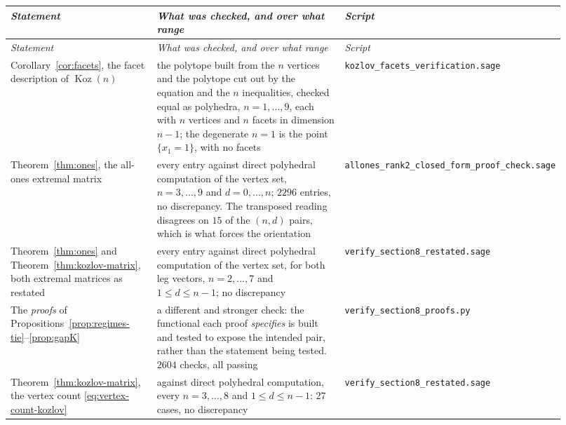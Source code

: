 \documentclass[11pt, a4paper, abstract=yes]{scrartcl}
\theoremstyle{definition}
\theoremstyle{remark}
\theoremstyle{plain}
\newcommand{\Koz}{\operatorname{Koz}}
\begin{document}
\begingroup\small
\begin{longtable}{@{}p{0.27\linewidth}p{0.38\linewidth}>{\raggedright\arraybackslash}p{0.27\linewidth}@{}}
  \toprule
  \emph{Statement} & \emph{What was checked, and over what range} & \emph{Script} \\
  \midrule\endfirsthead
  \toprule
  \emph{Statement} & \emph{What was checked, and over what range} & \emph{Script} \\
  \midrule\endhead
  Corollary~\ref{cor:facets}, the facet description of $\Koz(n)$
    & the polytope built from the $n$ vertices and the polytope cut out by the equation and the
      $n$ inequalities, checked equal as polyhedra, $n = 1,\dots,9$, each with $n$ vertices and
      $n$ facets in dimension $n-1$; the degenerate $n = 1$ is the point $\lbrace x_1=1\rbrace$,
      with no facets
    & \texttt{\footnotesize kozlov\_\allowbreak facets\_\allowbreak verification.sage} \\
  \addlinespace
  Theorem~\ref{thm:ones}, the all-ones extremal matrix
    & every entry against direct polyhedral computation of the vertex set, $n = 3,\dots,9$ and
      $d = 0,\dots,n$; $2296$ entries, no discrepancy. The transposed reading disagrees on $15$ of
      the $(n,d)$ pairs, which is what forces the orientation
    & \texttt{\footnotesize allones\_\allowbreak rank2\_\allowbreak closed\_\allowbreak form\_\allowbreak proof\_\allowbreak check.sage} \\
  \addlinespace
  Theorem~\ref{thm:ones} and Theorem~\ref{thm:kozlov-matrix}, both extremal matrices as restated
    & every entry against direct polyhedral computation of the vertex set, for both leg vectors,
      $n = 2,\dots,7$ and $1 \le d \le n-1$; no discrepancy
    & \texttt{\footnotesize verify\_\allowbreak section8\_\allowbreak restated.sage} \\
  \addlinespace
  The \emph{proofs} of Propositions~\ref{prop:regimes-tie}--\ref{prop:gapK}
    & a different and stronger check: the functional each proof \emph{specifies} is built and
      tested to expose the intended pair, rather than the statement being tested. $2604$ checks,
      all passing
    & \texttt{\footnotesize verify\_\allowbreak section8\_\allowbreak proofs.py} \\
  \addlinespace
  Theorem~\ref{thm:kozlov-matrix}, the vertex count \eqref{eq:vertex-count-kozlov}
    & against direct polyhedral computation, every $n = 3,\dots,8$ and $1 \le d \le n-1$:
      $27$ cases, no discrepancy
    & \texttt{\footnotesize verify\_\allowbreak section8\_\allowbreak restated.sage} \\

\end{longtable}
\end{document}
